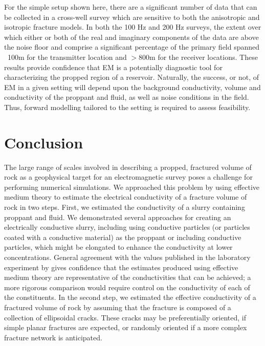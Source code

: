 

For the simple setup shown here, there are a significant number of data that can be collected in a cross-well survey which are sensitive to both the anisotropic and isotropic fracture models. In both the 100 Hz and 200 Hz surveys, the extent over which either or both of the real and imaginary components of the data are above the noise floor and comprise a significant percentage of the primary field spanned ~100m for the transmitter location and $> 800$m for the receiver locations. These results provide confidence that EM is a potentially diagnostic tool for characterizing the propped region of a reservoir. Naturally, the success, or not, of EM in a given setting will depend upon the background conductivity, volume and conductivity of the proppant and fluid, as well as noise conditions in the field. Thus, forward modelling tailored to the setting is required to assess feasibility.
\section{Conclusion}

The large range of scales involved in describing a propped, fractured volume of rock as a geophysical target for an electromagnetic survey poses a challenge for performing numerical simulations. We approached this problem by using effective medium theory to estimate the electrical conductivity of a fracture volume of rock in two steps. First, we estimated the conductivity of a slurry containing proppant and fluid. We demonstrated several approaches for creating an electrically conductive slurry, including using conductive particles (or particles coated with a conductive material) as the proppant or including conductive particles, which might be elongated to enhance the conductivity at lower concentrations. General agreement with the values published in the laboratory experiment by \cite{Zhang2016} gives confidence that the estimates produced using effective medium theory are representative of the conductivities that can be achieved; a more rigorous comparison would require control on the conductivity of each of the constituents. In the second step, we estimated the effective conductivity of a fractured volume of rock by assuming that the fracture is composed of a collection of ellipsoidal cracks. These cracks may be preferentially oriented, if simple planar fractures are expected, or randomly oriented if a more complex fracture network is anticipated.

